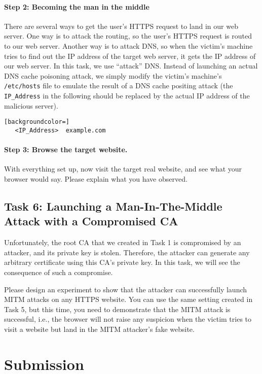 \paragraph{Step 2: Becoming the man in the middle} 
There are several ways to get the user's HTTPS request to land in our web server. One way is to
attack the routing, so the user's HTTPS request is routed to our web server. Another way is
to attack DNS, so when the victim's machine tries to find out the IP address of the target
web server, it gets the IP address of our web server. In this task, we use ``attack'' DNS. Instead of
launching an actual DNS cache poisoning attack, we simply modify the victim's machine's 
\texttt{/etc/hosts} file to emulate the result of a DNS cache positing attack (the
\texttt{IP\_Address} in the following should be replaced by the actual 
IP address of the malicious server).

\begin{lstlisting}[backgroundcolor=]
   <IP_Address>  example.com
\end{lstlisting}


\paragraph{Step 3: Browse the target website.}
With everything set up, now visit the target real website, and 
see what your browser would say. Please explain what you have observed. 




\subsection{Task 6: Launching a Man-In-The-Middle Attack with a Compromised CA}

Unfortunately, the root CA that we created in Task 1 is compromised by an attacker, and its private
key is stolen. Therefore, the attacker can generate any arbitrary certificate 
using this CA's private key. In this task, we will see 
the consequence of such a compromise. 


Please design an experiment to show that the attacker can successfully launch MITM attacks on
any HTTPS website. You can use the same setting created in Task 5, but this time, you need to
demonstrate that the MITM attack is successful, i.e., the browser will not 
raise any suspicion when the victim tries to visit a website but land in the MITM attacker's
fake website.




\section{Submission}

\seedsubmission




